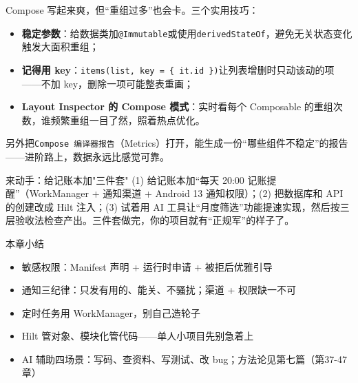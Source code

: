 
Compose 写起来爽，但“重组过多”也会卡。三个实用技巧：

\begin{itemize}
  \item \textbf{稳定参数}：给数据类加\texttt{@Immutable}或使用\texttt{derivedStateOf}，避免无关状态变化触发大面积重组；
  \item \textbf{记得用 key}：\texttt{items(list, key = \{ it.id \})}让列表增删时只动该动的项——不加 key，删除一项可能整表重画；
  \item \textbf{Layout Inspector 的 Compose 模式}：实时看每个 Composable 的重组次数，谁频繁重组一目了然，照着热点优化。
\end{itemize}

另外把\texttt{Compose 编译器报告}（Metrics）打开，能生成一份“哪些组件不稳定”的报告——进阶路上，数据永远比感觉可靠。

\begin{tcbpractice}{来动手：给记账本加"三件套"}
(1) 给记账本加“每天 20:00 记账提醒”（WorkManager + 通知渠道 + Android 13 通知权限）；(2) 把数据库和 API 的创建改成 Hilt 注入；(3) 试着用 AI 工具让“月度筛选”功能提速实现，然后按三层验收法检查产出。三件套做完，你的项目就有“正规军”的样子了。

\end{tcbpractice}

\begin{tcbsummary}{本章小结}
\begin{itemize}
  \item 敏感权限：Manifest 声明 + 运行时申请 + 被拒后优雅引导
  \item 通知三纪律：只发有用的、能关、不骚扰；渠道 + 权限缺一不可
  \item 定时任务用 WorkManager，别自己造轮子
  \item Hilt 管对象、模块化管代码——单人小项目先别急着上
  \item AI 辅助四场景：写码、查资料、写测试、改 bug；方法论见第七篇（第37-47章）
\end{itemize}

\end{tcbsummary}
